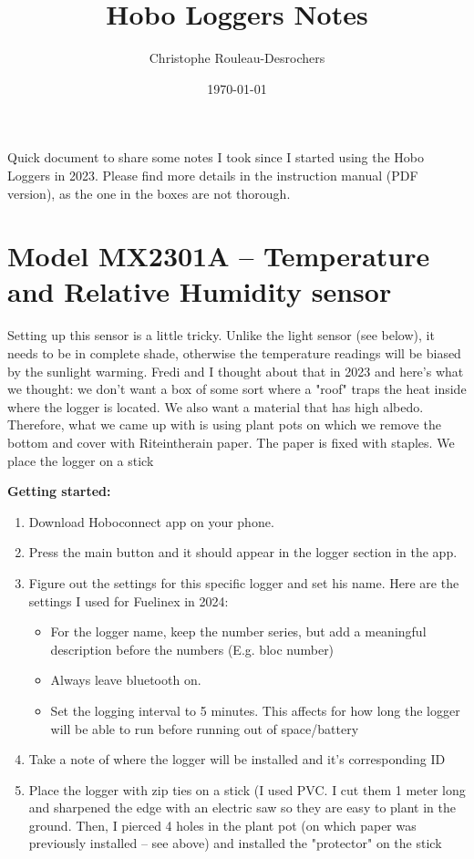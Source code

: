 \documentclass[11pt]{article}
\title{Hobo Loggers Notes}
\author{Christophe Rouleau-Desrochers }
\date{\today}
\begin{document}
\maketitle	




Quick document to share some notes I took since I started using the Hobo Loggers in 2023. Please find more details in the instruction manual (PDF version), as the one in the boxes are not thorough. 

\section{Model MX2301A -- Temperature and Relative Humidity sensor}
Setting up this sensor is a little tricky. Unlike the light sensor (see below), it needs to be in complete shade, otherwise the temperature readings will be  biased by the sunlight warming. Fredi and I thought about that in 2023 and here's what we thought: we don't want a box of some sort where a "roof" traps the heat inside  where the logger is located. We also want a material that has high albedo. Therefore, what we came up with is using plant pots on which we remove the bottom and cover with Riteintherain paper. The paper is fixed with staples. We place the logger on a stick
\par \textbf {Getting started:}
\begin {enumerate}
	\item Download Hoboconnect app on your phone.
	\item Press the main button and it should appear in the logger section in the app. 
	\item Figure out the settings for this specific logger and set his name. Here are the settings I used for Fuelinex in 2024:
		\begin {itemize}
			\item For the logger name, keep the number series, but add a meaningful description before the numbers (E.g. bloc number)
			\item Always leave bluetooth on. 
			\item Set the logging interval to 5 minutes. This affects for how long the logger will be able to run before running out of space/battery
		\end {itemize}
	\item Take a note of where the logger will be installed and it's corresponding ID
	\item Place the logger with zip ties on a stick (I used PVC. I cut them 1 meter long and sharpened the edge with an electric saw so they are easy to plant in the ground. Then, I pierced 4 holes in the plant pot (on which paper was previously installed -- see above) and installed the "protector" on the stick
\end {enumerate}
\end{document}
